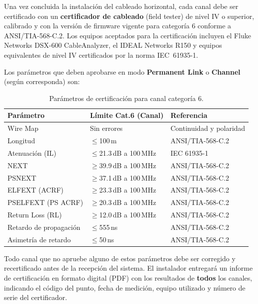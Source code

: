 Una vez concluida la instalación del cableado horizontal, cada canal debe ser
certificado con un \textbf{certificador de cableado} (field tester) de nivel
IV o superior, calibrado y con la versión de firmware vigente para categoría 6
conforme a \mbox{ANSI/TIA-568-C.2}. Los equipos aceptados para la certificación
incluyen el Fluke Networks DSX-600 CableAnalyzer, el IDEAL Networks R150 y
equipos equivalentes de nivel IV certificados por la norma \mbox{IEC 61935-1}.

Los parámetros que deben aprobarse en modo \textbf{Permanent Link} o
\textbf{Channel} (según corresponda) son:

\begin{table}[H]
    \centering
    \caption{Parámetros de certificación para canal categoría 6.}
    \label{tab:certificacion}
    \begin{tabular}{|p{4.5cm}|p{4cm}|p{5cm}|}
        \hline
        \textbf{Parámetro} & \textbf{Límite Cat.6 (Canal)} & \textbf{Referencia} \\
        \hline
        Wire Map              & Sin errores & Continuidad y polaridad \\
        \hline
        Longitud              & $\leq$100\,m & ANSI/TIA-568-C.2 \\
        \hline
        Atenuación (IL)       & $\leq$21.3\,dB a 100\,MHz & IEC 61935-1 \\
        \hline
        NEXT                  & $\geq$39.9\,dB a 100\,MHz & ANSI/TIA-568-C.2 \\
        \hline
        PSNEXT                & $\geq$37.1\,dB a 100\,MHz & ANSI/TIA-568-C.2 \\
        \hline
        ELFEXT (ACRF)         & $\geq$23.3\,dB a 100\,MHz & ANSI/TIA-568-C.2 \\
        \hline
        PSELFEXT (PS ACRF)    & $\geq$20.3\,dB a 100\,MHz & ANSI/TIA-568-C.2 \\
        \hline
        Return Loss (RL)      & $\geq$12.0\,dB a 100\,MHz & ANSI/TIA-568-C.2 \\
        \hline
        Retardo de propagación& $\leq$555\,ns & ANSI/TIA-568-C.2 \\
        \hline
        Asimetría de retardo  & $\leq$50\,ns  & ANSI/TIA-568-C.2 \\
        \hline
    \end{tabular}
\end{table}

Todo canal que no apruebe alguno de estos parámetros debe ser corregido y
recertificado antes de la recepción del sistema. El instalador entregará un
informe de certificación en formato digital (PDF) con los resultados de
\textbf{todos} los canales, indicando el código del punto, fecha de medición,
equipo utilizado y número de serie del certificador.

